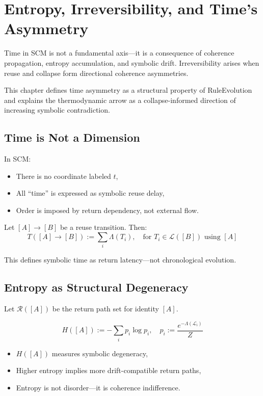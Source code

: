 \chapter{Entropy, Irreversibility, and Time’s Asymmetry} \label{chapter-entropy-time}

Time in SCM is not a fundamental axis—it is a consequence of coherence propagation, entropy accumulation, and symbolic drift. Irreversibility arises when reuse and collapse form directional coherence asymmetries.

This chapter defines time asymmetry as a structural property of RuleEvolution and explains the thermodynamic arrow as a collapse-informed direction of increasing symbolic contradiction.

\section{Time is Not a Dimension} \label{sec:time-nonaxis}

In SCM:
\begin{itemize}
  \item There is no coordinate labeled $t$,
  \item All “time” is expressed as symbolic reuse delay,
  \item Order is imposed by return dependency, not external flow.
\end{itemize}

Let $[A] \to [B]$ be a reuse transition. Then:
\[
T([A] \to [B]) := \sum_i \Lambda(T_i),\quad \text{for } T_i \in \mathcal{L}([B]) \text{ using } [A]
\]

This defines symbolic time as return latency—not chronological evolution.

\section{Entropy as Structural Degeneracy} \label{sec:entropy-def}

Let $\mathcal{R}([A])$ be the return path set for identity $[A]$.

\[
H([A]) := -\sum_i p_i \log p_i,\quad p_i := \frac{e^{-\Lambda(\mathcal{L}_i)}}{Z}
\]

\begin{itemize}
  \item $H([A])$ measures symbolic degeneracy,
  \item Higher entropy implies more drift-compatible return paths,
  \item Entropy is not disorder—it is coherence indifference.
\end{itemize}

